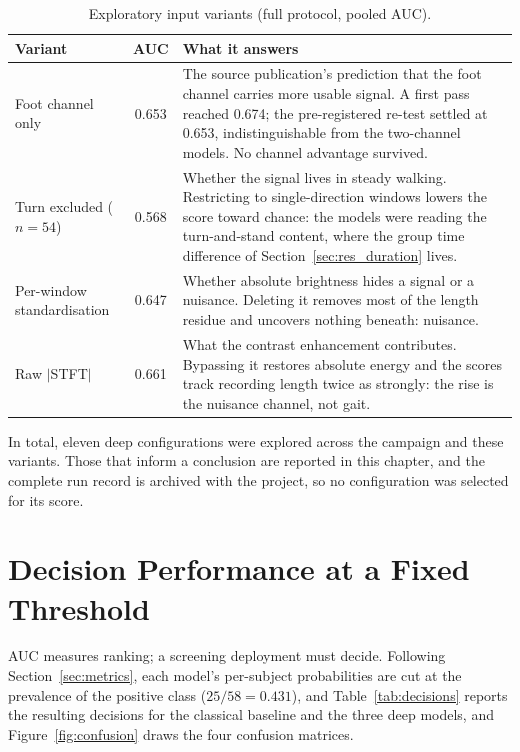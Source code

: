 \begin{table}[htbp]
  \centering
  \caption[Exploratory input variants]{Exploratory input variants (full protocol, pooled AUC).}
  \label{tab:ablations}
  \small
  \begin{tabular}{@{}lcp{7.2cm}@{}}
    \toprule
    Variant & AUC & What it answers \\
    \midrule
    Foot channel only & 0.653 &
      The source publication's prediction that the foot channel carries more
      usable signal. A first pass reached 0.674; the pre-registered re-test
      settled at 0.653, indistinguishable from the two-channel models. No
      channel advantage survived. \\
    Turn excluded ($n=54$) & 0.568 &
      Whether the signal lives in steady walking. Restricting to
      single-direction windows lowers the score toward chance: the models
      were reading the turn-and-stand content, where the group time
      difference of Section~\ref{sec:res_duration} lives. \\
    Per-window standardisation & 0.647 &
      Whether absolute brightness hides a signal or a nuisance. Deleting it
      removes most of the length residue and uncovers nothing beneath:
      nuisance. \\
    Raw $|$STFT$|$ & 0.661 &
      What the contrast enhancement contributes. Bypassing it restores
      absolute energy and the scores track recording length twice as
      strongly: the rise is the nuisance channel, not gait. \\
    \bottomrule
  \end{tabular}
\end{table}

In total, eleven deep configurations were explored across the campaign and
these variants. Those that inform a conclusion are reported in this chapter,
and the complete run record is archived with the project, so no configuration
was selected for its score.

\section{Decision Performance at a Fixed Threshold}
\label{sec:res-decisions}

AUC measures ranking; a screening deployment must decide. Following
Section~\ref{sec:metrics}, each model's per-subject probabilities are cut at
the prevalence of the positive class ($25/58 = 0.431$), and
Table~\ref{tab:decisions} reports the resulting decisions for the classical
baseline and the three deep models, and Figure~\ref{fig:confusion} draws the
four confusion matrices.

